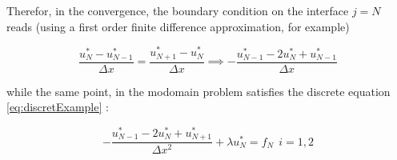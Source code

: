 \indent Therefor, in the convergence, the boundary condition on the interface $j = N$ reads (using a first order finite difference approximation, for example)

\begin{equation}
	\frac{u^*_N - u^*_{N-1}}{\Delta x} = \frac{u^*_{N+1} - u^*_{N}}{\Delta x} \implies - \frac{u^*_{N-1} - 2u^*_N  + u^*_{N-1}}{\Delta x}
\end{equation}

\noindent while the same point, in the modomain problem satisfies the discrete equation \eqref{eq:discretExample} : 

\begin{equation}
\label{eq:discretExample}
- \frac{u_{N-1}^* - 2u_{N}^* + u_{N+1}^* }{\Delta x^2} + \lambda u_{N}^* = f_N \ \ i=1,2
\end{equation}